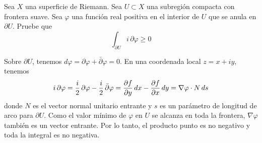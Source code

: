 \begin{exercise}
Sea $X$ una superficie de Riemann. Sea $U \subset X$ una subregión compacta con frontera suave. Sea $\varphi$ una función real positiva en el interior de $U$ que se anula en $\partial U$. Pruebe que
$$\int_{\partial U} i \, \partial \varphi \ge 0$$
\end{exercise}

\begin{solution}
Sobre $\partial U$, tenemos $d\varphi = \partial \varphi + \bar \partial \varphi = 0$. En una coordenada local $z = x + iy$, tenemos
$$i \, \partial \varphi = \frac i2 \, \partial \varphi - \frac i2 \, \bar \partial \varphi = \frac {\partial f} {\partial y} \, dx - \frac {\partial f} {\partial x} \, dy =  \nabla \varphi \cdot N \, ds$$
donde $N$ es el vector normal unitario entrante y $s$ es un parámetro de longitud de arco para $\partial U$. Como el valor mínimo de $\varphi$ en $U$ se alcanza en toda la frontera, $\nabla \varphi$ también es un vector entrante. Por lo tanto, el producto punto es no negativo y toda la integral es no negativa.
\end{solution}
